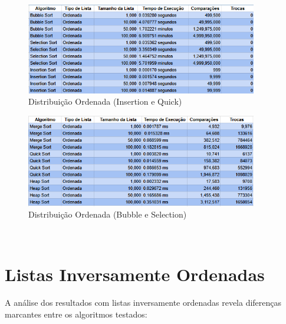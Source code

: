 \documentclass[12pt, a4paper]{report}
\begin{document}
\begin{figure}[H]
    \centering
    \includegraphics[width=0.9\textwidth]{listas/ordenadab.png}
    \caption{Distribuição Ordenada (Insertion e Quick)}
    \label{fig:ordenadab}
\end{figure}
\begin{figure}[H]
    \centering
    \includegraphics[width=0.9\textwidth]{listas/ordenadam.png}
    \caption{Distribuição Ordenada (Bubble e Selection)}
    \label{fig:ordenadam}
\end{figure}
\

\section{Listas Inversamente Ordenadas}
A análise dos resultados com listas inversamente ordenadas revela diferenças marcantes entre os algoritmos testados:
\end{document}
